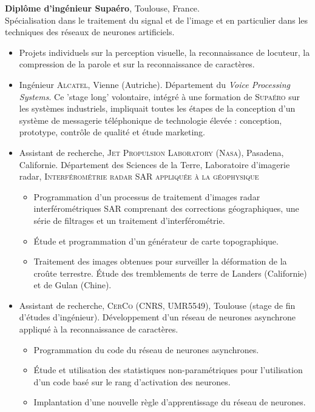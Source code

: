 \vspace*{.3cm} 
	\textbf{Diplôme d'ingénieur {\sc Supaéro}}, Toulouse, France.  \hfill {}\\
Spécialisation dans le traitement du signal et de l'image et en particulier dans les techniques des réseaux de neurones artificiels. \\
\vspace*{-.1in}
	\begin{itemize}
	 	\item Projets individuels sur la perception visuelle, la reconnaissance de locuteur, la compression de la parole et sur la reconnaissance de caractères.
		\item Ingénieur \textsc{Alcatel}, Vienne (Autriche).  Département du \emph{Voice Processing Systems}. Ce 'stage long' volontaire, intégré à  une formation de \textsc{Supaéro} sur les systèmes industriels, impliquait toutes les étapes de la conception d'un système de messagerie téléphonique de technologie élevée : conception, prototype, contrôle de qualité et étude marketing. %
		\item  Assistant de recherche, \textsc{Jet Propulsion Laboratory}  (\textsc{Nasa}), Pasadena, Californie. Département des Sciences de la Terre, Laboratoire d'imagerie radar, \textsc{Interférométrie radar SAR appliquée à la géophysique}
		\begin{itemize}
			\item Programmation d'un processus de traitement d'images radar interférométriques SAR comprenant des corrections géographiques, une série de filtrages et un traitement d'interférométrie. 
			\item \'Etude et programmation d'un générateur de carte topographique.%
			\item Traitement des images obtenues pour surveiller la déformation de la croûte terrestre. \'Etude des tremblements de terre de Landers (Californie) et de Gulan (Chine).
		\end{itemize} 
		\item Assistant de recherche, \textsc{CerCo}  (CNRS, UMR5549), Toulouse (stage de fin d'études d'ingénieur). Développement d'un réseau de neurones asynchrone appliqué à  la reconnaissance de caractères. 
		\begin{itemize}
			\item Programmation du code du réseau de neurones asynchrones. 
			\item \'Etude et utilisation des statistiques non-paramétriques %
pour l'utili\-sation d'un code basé sur le rang d'activation des neurones. \item Implantation d'une nouvelle règle d'apprentissage du réseau de neurones.
		\end{itemize} %
	\end{itemize}
	
